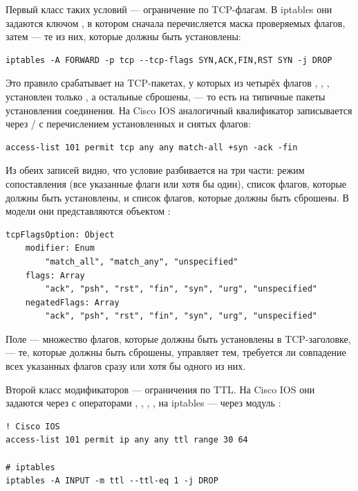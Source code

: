 Первый класс таких условий --- ограничение по TCP-флагам. В iptables они задаются ключом , в котором сначала перечисляется маска проверяемых флагов, затем --- те из них, которые должны быть установлены:

\begin{verbatim}
iptables -A FORWARD -p tcp --tcp-flags SYN,ACK,FIN,RST SYN -j DROP
\end{verbatim}

Это правило срабатывает на TCP-пакетах, у которых из четырёх флагов , , ,  установлен только , а остальные сброшены, --- то есть на типичные пакеты установления соединения. На Cisco IOS аналогичный квалификатор записывается через / с перечислением установленных и снятых флагов:

\begin{verbatim}
access-list 101 permit tcp any any match-all +syn -ack -fin
\end{verbatim}

Из обеих записей видно, что условие разбивается на три части: режим сопоставления (все указанные флаги или хотя бы один), список флагов, которые должны быть установлены, и список флагов, которые должны быть сброшены. В модели они представляются объектом :

\begin{lstlisting}[style=schemastyle]
tcpFlagsOption: Object
    modifier: Enum
        "match_all", "match_any", "unspecified"
    flags: Array
        "ack", "psh", "rst", "fin", "syn", "urg", "unspecified"
    negatedFlags: Array
        "ack", "psh", "rst", "fin", "syn", "urg", "unspecified"
\end{lstlisting}

Поле  --- множество флагов, которые должны быть установлены в TCP-заголовке,  --- те, которые должны быть сброшены,  управляет тем, требуется ли совпадение всех указанных флагов сразу или хотя бы одного из них.

Второй класс модификаторов --- ограничения по TTL. На Cisco IOS они задаются через  с операторами , , , , на iptables --- через модуль :

\begin{verbatim}
! Cisco IOS
access-list 101 permit ip any any ttl range 30 64

# iptables
iptables -A INPUT -m ttl --ttl-eq 1 -j DROP
\end{verbatim}

